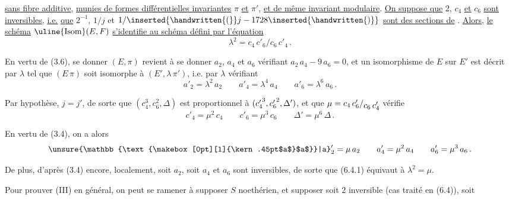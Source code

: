 %
\space
\uline{sans fibre additive}, \uline{munies de formes différentielles invariantes} $\pi$ \uline{et} $\pi'$, \uline{et de même invariant modulaire}. \uline{On suppose que} $2$, $c_4$ \uline{et} $c_6$ \uline{sont inversibles}, \uline{i.e.} \uline{que} $2^{-1}$, $1/j$ et $1/\inserted{\handwritten{(}}j-1728\inserted{\handwritten{)}}$ \uline{sont des sections de} \reversemarginpar{}\normalmarginpar. \uline{Alors}, \uline{le schéma} $\text{\uline{Isom}}(E,F)$ \uline{s'identifie au schéma défini par l'équation}
\[
\lambda^2=c_4\,c'_6/c_6\,c'_4 \, .
\]

En vertu de (3.6), se donner $(E,\pi)$ revient à se donner $a_2$, $a_4$ et $a_6$ vérifiant $a_2\,a_4-9\,a_6=0$, et un isomorphisme de $E$ sur $E'$ est décrit par $\lambda$ tel que $(E\,\pi)$ soit isomorphe à $(E',\lambda\,\pi')$, i.e. par $\lambda$ vérifiant
\[
a'_2=\lambda^2\,a_2 \qquad a'_4=\lambda^4\,a_4 \qquad a'_6=\lambda^6\,a_6 \, . \tag*{(6.4.1)}
\]

Par hypothèse, $j=j'$, de sorte que $(c_4^3,c_6^2,\Delta)$ est proportionnel à $(c_4^{\raisebox{-.38ex}{$\scriptstyle\prime$}\,3},c_6^{\raisebox{-.38ex}{$\scriptstyle\prime$}\,2},\Delta')$, et que $\mu=c_4\,c'_6/\raisebox{-.52ex}{$c_6\,c'_4$}$ vérifie
\[
c'_4=\mu^2\,c_4 \qquad c'_6=\mu^3\,c_6 \qquad \Delta'=\mu^6\,\Delta \, . \tag*{(6.4.2)}
\]

En vertu de (3.4), on a alors
\[
{\unsure{\mathbb{\text{\makebox[0pt][l]{\kern.45pt$a$}$a$}}|a}}'_2=\mu\,a_2 \qquad a'_4=\mu^2\,a_4 \qquad a'_6=\mu^3\,a_6 \, .
\]

De plus, d'après (3.4) encore, localement, soit $a_2$, soit $a_4$ et $a_6$ sont inversibles, de sorte que (6.4.1) équivaut à $\lambda^2=\mu$.

Pour prouver (III) en général, on peut se ramener à supposer $S$ noethérien, et supposer soit $2$ inversible (cas traité en (6.4)), soit%
